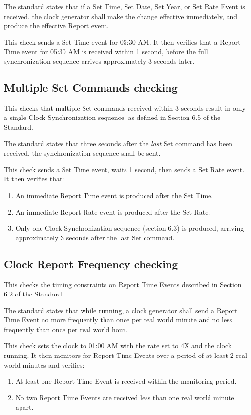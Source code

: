The standard states that if a Set Time, Set Date, Set Year, or Set Rate Event is received,
the clock generator shall make the change effective immediately, and produce the effective
Report event.

This check sends a Set Time event for 05:30 AM.
It then verifies that a Report Time event for 05:30 AM is received within 1 second,
before the full synchronization sequence arrives approximately 3 seconds later.

\subsection{Multiple Set Commands checking}

This checks that multiple Set commands received within 3 seconds result in only
a single Clock Synchronization sequence, as defined in Section 6.5 of the Standard.

The standard states that three seconds after the \emph{last} Set command has been received,
the synchronization sequence shall be sent.

This check sends a Set Time event, waits 1 second, then sends a Set Rate event.
It then verifies that:
\begin{enumerate}
\item An immediate Report Time event is produced after the Set Time.
\item An immediate Report Rate event is produced after the Set Rate.
\item Only one Clock Synchronization sequence (section 6.3) is produced,
      arriving approximately 3 seconds after the last Set command.
\end{enumerate}

\subsection{Clock Report Frequency checking}

This checks the timing constraints on Report Time Events described in Section 6.2
of the Standard.

The standard states that while running, a clock generator shall send a Report Time Event
no more frequently than once per real world minute and no less frequently than once per
real world hour.

This check sets the clock to 01:00 AM with the rate set to 4X and the clock running.
It then monitors for Report Time Events over a period of at least 2 real world minutes
and verifies:
\begin{enumerate}
\item At least one Report Time Event is received within the monitoring period.
\item No two Report Time Events are received less than one real world minute apart.
\end{enumerate}

